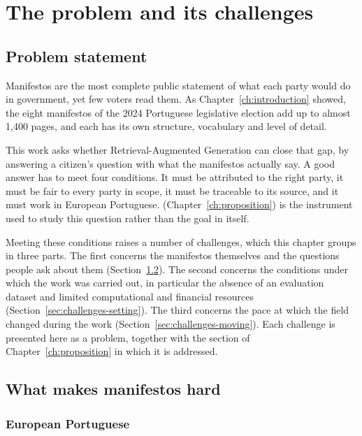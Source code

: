 \chapter{The problem and its challenges} \label{ch:problem}

\section{Problem statement} \label{sec:problem-statement}

Manifestos are the most complete public statement of what each party would do in government, yet few voters read them. As Chapter~\ref{ch:introduction} showed, the eight manifestos of the 2024 Portuguese legislative election add up to almost 1{,}400 pages, and each has its own structure, vocabulary and level of detail.

This work asks whether Retrieval-Augmented Generation can close that gap, by answering a citizen's question with what the manifestos actually say. A good answer has to meet four conditions. It must be attributed to the right party, it must be fair to every party in scope, it must be traceable to its source, and it must work in European Portuguese. \sysname{} (Chapter~\ref{ch:proposition}) is the instrument used to study this question rather than the goal in itself.

Meeting these conditions raises a number of challenges, which this chapter groups in three parts. The first concerns the manifestos themselves and the questions people ask about them (Section~\ref{sec:challenges-domain}). The second concerns the conditions under which the work was carried out, in particular the absence of an evaluation dataset and limited computational and financial resources (Section~\ref{sec:challenges-setting}). The third concerns the pace at which the field changed during the work (Section~\ref{sec:challenges-moving}). Each challenge is presented here as a problem, together with the section of Chapter~\ref{ch:proposition} in which it is addressed.

\section{What makes manifestos hard} \label{sec:challenges-domain}

\subsection{European Portuguese} \label{subsec:challenge-language}

